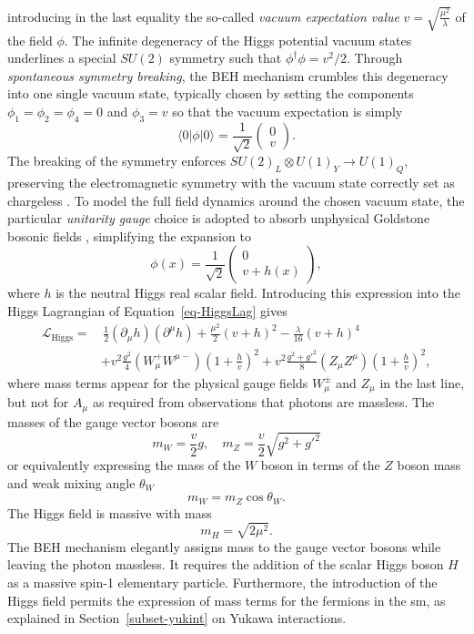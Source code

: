 introducing in the last equality the so-called \textit{vacuum expectation value} $v = \sqrt{\frac{\mu^2}{\lambda}}$ of the field $\phi$. The infinite degeneracy of the Higgs potential vacuum states underlines a special $SU(2)$ symmetry such that $\phi^{\dagger} \phi = v^2/2$. Through \textit{spontaneous symmetry breaking}, the BEH mechanism crumbles this degeneracy into one single vacuum state, typically chosen by setting the components $\phi_1 = \phi_2 = \phi_4 = 0$ and $\phi_3 = v$ so that the vacuum expectation is simply
\begin{equation}
\langle 0|\phi|0 \rangle = \frac{1}{\sqrt{2}} \begin{pmatrix}
        0\\ 
        v
    \end{pmatrix}.
\end{equation}
The breaking of the symmetry enforces $SU(2)_L \otimes U(1)_Y \rightarrow U(1)_Q$, preserving the electromagnetic symmetry with the vacuum state correctly set as chargeless \cite{DJOUADI20081}. To model the full field dynamics around the chosen vacuum state, the particular \textit{unitarity gauge} \cite{PhysRevD.7.1068} choice is adopted to absorb unphysical Goldstone bosonic fields \cite{Goldstone:343400}, simplifying the expansion to
\begin{equation}
    \phi(x) = \frac{1}{\sqrt{2}} \begin{pmatrix}
            0\\ 
            v + h(x)
        \end{pmatrix},
\end{equation}
where $h$ is the neutral Higgs real scalar field. Introducing this expression into the Higgs Lagrangian of Equation~\ref{eq-HiggsLag} gives
\begin{equation}\label{eq-fullHiggs}
    \begin{split}
        \mathcal{L}_{\text{Higgs}} = & \,\frac{1}{2} (\partial_\mu h)(\partial^\mu h) + \frac{\mu^2}{2}(v+h)^2  - \frac{\lambda}{16}(v+h)^4 \\
        &+ v^2 \frac{g^2}{4} (W_{\mu}^+W^{\mu-})(1+\frac{h}{v})^2 + v^2 \frac{g^2 + {g'}^2}{8}(Z_{\mu}Z^{\mu})(1+\frac{h}{v})^2, 
    \end{split}
\end{equation}
where mass terms appear for the physical gauge fields $W_{\mu}^{\pm}$ and $Z_\mu$ in the last line, but not for $A_{\mu}$ as required from observations that photons are massless. The masses of the gauge vector bosons are
\begin{equation}
    m_W = \frac{v}{2} g , \quad m_Z = \frac{v}{2}\sqrt{g^2 +g'^2} 
\end{equation}
or equivalently expressing the mass of the $W$ boson in terms of the $Z$ boson mass and weak mixing angle $\theta_W$ \[m_W = m_Z \cos\theta_W.\] The Higgs field is massive with mass \[m_H = \sqrt{2\mu^2}.\] The BEH mechanism elegantly assigns mass to the gauge vector bosons while leaving the photon massless. It requires the addition of the scalar Higgs boson $H$ as a massive spin-1 elementary particle. Furthermore, the introduction of the Higgs field permits the expression of mass terms for the fermions in the \gls{sm}, as explained in Section~\ref{subset-yukint} on Yukawa interactions. 

